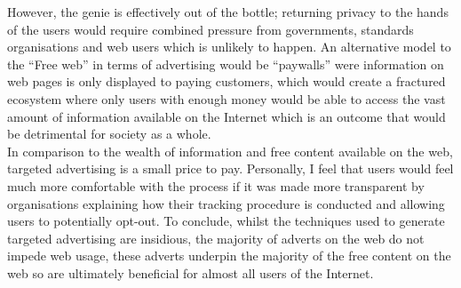 \documentclass{article}
\begin{document}
However, the genie is effectively out of the bottle; returning privacy to the hands of the users would require combined pressure from governments, standards organisations and web users which is unlikely to happen. An alternative model to the ``Free web'' in terms of advertising would be ``paywalls'' were information on web pages is only displayed to paying customers, which would create a fractured ecosystem where only users with enough money would be able to access the vast amount of information available on the Internet which is an outcome that would be detrimental for society as a whole. \\

In comparison to the wealth of information and free content available on the web, targeted advertising is a small price to pay. Personally, I feel that users would feel much more comfortable with the process if it was made more transparent by organisations explaining how their tracking procedure is conducted and allowing users to potentially opt-out. To conclude, whilst the techniques used to generate targeted advertising are insidious, the majority of adverts on the web do not impede web usage, these adverts underpin the majority of the free content on the web so are ultimately beneficial for almost all users of the Internet.

\medskip
\printbibliography
\end{document}
